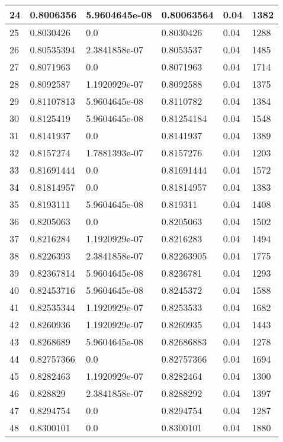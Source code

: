 \begin{longtable}{|l|l|l|l|l|l|}
24 & 0.8006356 & 5.9604645e-08 & 0.80063564 & 0.04 & 1382 \\ \hline 
25 & 0.8030426 & 0.0 & 0.8030426 & 0.04 & 1288 \\ \hline 
26 & 0.80535394 & 2.3841858e-07 & 0.8053537 & 0.04 & 1485 \\ \hline 
27 & 0.8071963 & 0.0 & 0.8071963 & 0.04 & 1714 \\ \hline 
28 & 0.8092587 & 1.1920929e-07 & 0.8092588 & 0.04 & 1375 \\ \hline 
29 & 0.81107813 & 5.9604645e-08 & 0.8110782 & 0.04 & 1384 \\ \hline 
30 & 0.8125419 & 5.9604645e-08 & 0.81254184 & 0.04 & 1548 \\ \hline 
31 & 0.8141937 & 0.0 & 0.8141937 & 0.04 & 1389 \\ \hline 
32 & 0.8157274 & 1.7881393e-07 & 0.8157276 & 0.04 & 1203 \\ \hline 
33 & 0.81691444 & 0.0 & 0.81691444 & 0.04 & 1572 \\ \hline 
34 & 0.81814957 & 0.0 & 0.81814957 & 0.04 & 1383 \\ \hline 
35 & 0.8193111 & 5.9604645e-08 & 0.819311 & 0.04 & 1408 \\ \hline 
36 & 0.8205063 & 0.0 & 0.8205063 & 0.04 & 1502 \\ \hline 
37 & 0.8216284 & 1.1920929e-07 & 0.8216283 & 0.04 & 1494 \\ \hline 
38 & 0.8226393 & 2.3841858e-07 & 0.82263905 & 0.04 & 1775 \\ \hline 
39 & 0.82367814 & 5.9604645e-08 & 0.8236781 & 0.04 & 1293 \\ \hline 
40 & 0.82453716 & 5.9604645e-08 & 0.8245372 & 0.04 & 1588 \\ \hline 
41 & 0.82535344 & 1.1920929e-07 & 0.8253533 & 0.04 & 1682 \\ \hline 
42 & 0.8260936 & 1.1920929e-07 & 0.8260935 & 0.04 & 1443 \\ \hline 
43 & 0.8268689 & 5.9604645e-08 & 0.82686883 & 0.04 & 1278 \\ \hline 
44 & 0.82757366 & 0.0 & 0.82757366 & 0.04 & 1694 \\ \hline 
45 & 0.8282463 & 1.1920929e-07 & 0.8282464 & 0.04 & 1300 \\ \hline 
46 & 0.828829 & 2.3841858e-07 & 0.8288292 & 0.04 & 1397 \\ \hline 
47 & 0.8294754 & 0.0 & 0.8294754 & 0.04 & 1287 \\ \hline 
48 & 0.8300101 & 0.0 & 0.8300101 & 0.04 & 1880 \\ \hline 

\end{longtable}
